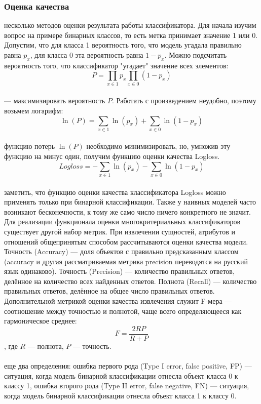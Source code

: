 \documentclass{article}
\newcommand\tab[1][1cm]{\hspace*{#1}}
\begin{document}
\subsubsection{Оценка качества}
 несколько методов оценки результата работы классификатора. Для начала изучим вопрос на примере бинарных классов, то есть метка принимает значение 1 или 0. Допустим, что для класса 1 вероятность того, что модель угадала правильно равна $p_x$, для класса 0 эта вероятность равна $1-p_x$. Можно подсчитать вероятность того, что классификатор  "угадает" значение всех элементов:\\
$$P = \prod_{x \in 1} p_x \prod_{x \in 0} (1-p_x)$$\\
 — максимизировать вероятность $P$. Работать с произведением неудобно, поэтому возьмем логарифм:\\
$$\ln(P) = \sum_{x \in 1} \ln(p_x)  + \sum_{x \in 0} \ln(1-p_x)$$\\
 функцию потерь $\ln(P)$ необходимо минимизировать, но, умножив эту функцию на минус один, получим функцию оценки качества Logloss.\\
$$Logloss = -\sum_{x \in 1} \ln(p_x)  - \sum_{x \in 0} \ln(1-p_x)$$\\
 заметить, что функцию оценки качества классификатора Logloss можно применять только при бинарной классификации. Также у наивных моделей часто возникают бесконечности, к тому же само число ничего конкретного не значит. Для реализации функционала оценки многокритериальных классификаторов существует другой набор метрик. При извлечении сущностей, атрибутов и отношений общепринятым способом рассчитываются оценки качества модели. Точность (Accuracy) — доля объектов с правильно предсказанным классом (accuracy и другая рассматриваемая метрика precision переводятся на русский язык одинаково). Точность (Precision) — количество правильных ответов, делённое на количество всех найденных ответов. Полнота (Recall) — количество правильных ответов, делённое на общее число правильных ответов. Дополнительной метрикой оценки качества извлечения служит F-мера — соотношение между точностью и полнотой, чаще всего определяющееся как гармоническое среднее:\\
$$F = \frac{2RP}{R+P}$$, где $R$ — полнота, $P$ — точность.\\
\\
 еще два определения: ошибка первого рода (Type I error, false positive, FP) — ситуация, когда модель бинарной классификации отнесла объект класса 0 к классу 1, ошибка второго рода (Type II error, false negative, FN) — ситуация, когда модель бинарной классификации отнесла объект класса 1 к классу 0.\\
\end{document}
